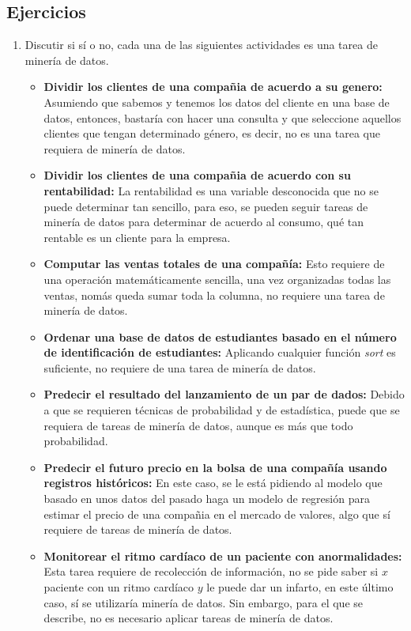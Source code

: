\documentclass{article}
\begin{document}
\subsection{Ejercicios}

\begin{enumerate}
  \item Discutir si sí o no, cada una de las siguientes actividades es una tarea de minería de datos.
        \begin{itemize}
          \item \textbf{Dividir los clientes de una compañia de acuerdo a su genero:} Asumiendo que sabemos y tenemos los datos del cliente en una base de datos, entonces, bastaría con hacer una consulta y que seleccione aquellos clientes que tengan determinado género, es decir, no es una tarea que requiera de minería de datos.
          \item \textbf{Dividir los clientes de una compañia de acuerdo con su rentabilidad:} La rentabilidad es una variable desconocida que no se puede determinar tan sencillo, para eso, se pueden seguir tareas de minería de datos para determinar de acuerdo al consumo, qué tan rentable es un cliente para la empresa.
          \item \textbf{Computar las ventas totales de una compañía:} Esto requiere de una operación matemáticamente sencilla, una vez organizadas todas las ventas, nomás queda sumar toda la columna, no requiere una tarea de minería de datos.
          \item \textbf{Ordenar una base de datos de estudiantes basado en el número de identificación de estudiantes:} Aplicando cualquier función \textit{sort} es suficiente, no requiere de una tarea de minería de datos.
          \item \textbf{Predecir el resultado del lanzamiento de un par de dados:} Debido a que se requieren técnicas de probabilidad y de estadística, puede que se requiera de tareas de minería de datos, aunque es más que todo probabilidad.
          \item \textbf{Predecir el futuro precio en la bolsa de una compañía usando registros históricos:} En este caso, se le está pidiendo al modelo que basado en unos datos del pasado haga un modelo de regresión para estimar el precio de una compañia en el mercado de valores, algo que sí requiere de tareas de minería de datos.
          \item \textbf{Monitorear el ritmo cardíaco de un paciente con anormalidades:} Esta tarea requiere de recolección de información, no se pide saber si \(x\) paciente con un ritmo cardíaco \(y\) le puede dar un infarto, en este último caso, sí se utilizaría minería de datos. Sin embargo, para el que se describe, no es necesario aplicar tareas de minería de datos.

\end{itemize}
\end{enumerate}
\end{document}
